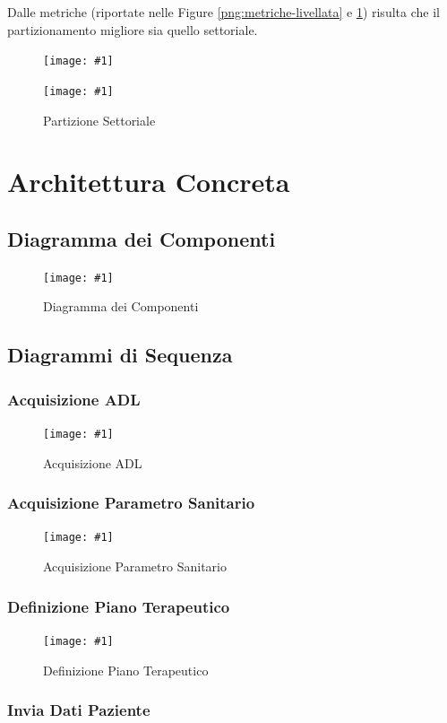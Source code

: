 \documentclass[a4paper,11pt,oneside, table]{article}
\newcommand{\putimage}[4] {
	\begin{figure}[H]
	    \centering
	    \texttt{[image: \#1]}
	    \caption{#2}\label{#3}
	\end{figure}
}
\newcommand{\putsubimage}[5] {
  \begin{minipage}{{#4}\linewidth}
	    \centering
      \texttt{[image: \#1]}
	    \caption{#2}\label{#3}
	\end{minipage}
}
\newcommand{\putimagecouple}[2] {
  \begin{figure}[!htb]
      \centering
      #1
      \hspace{0.5cm}
      #2
  \end{figure}
}
\begin{document}
Dalle metriche (riportate nelle Figure \ref{png:metriche-livellata} e \ref{png:metriche-settoriale}) risulta che il partizionamento migliore sia quello settoriale.

\putimagecouple
{\putsubimage{images/metriche-livellata.png}{Partizione per Livelli}{png:metriche-livellata}{0.45}{1}}
{\putsubimage{images/metriche-settoriale.png}{Partizione Settoriale}{png:metriche-settoriale}{0.45}{1}}

\section{Architettura Concreta}

\subsection{Diagramma dei Componenti}

\putimage{images/Diagramma dei Componenti.png}{Diagramma dei Componenti}{png:diagramma-dei-componenti}{1}

\subsection{Diagrammi di Sequenza}

\subsubsection{Acquisizione ADL}

\putimage{images/Diagramma di Sequenza/Acquisizione ADL.png}{Acquisizione ADL}{png:acquisizione-adl}{1}


\subsubsection{Acquisizione Parametro Sanitario}

\putimage{images/Diagramma di Sequenza/Acquisizione Parametro Sanitario.png}{Acquisizione Parametro Sanitario}{png:acquisizione-parametro-sanitario}{1}


\subsubsection{Definizione Piano Terapeutico}

\putimage{images/Diagramma di Sequenza/Definizione Piano Terapeutico.png}{Definizione Piano Terapeutico}{png:definizione-piano-terapeutico}{1}


\subsubsection{Invia Dati Paziente}
\end{document}
